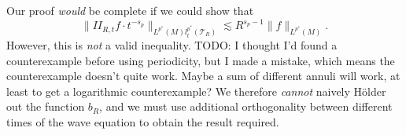 %
Our proof \emph{would} be complete if we could show that
%
\[ \| II_{R,t} f \cdot t^{-s_p} \|_{L^{p^*}(M) l^{p^*}_t(\mathcal{T}_R)} \lesssim R^{s_p - 1} \| f \|_{L^{p^*}(M)}. \]
%
However, this is \emph{not} a valid inequality. TODO: I thought I'd found a counterexample before using periodicity, but I made a mistake, which means the counterexample doesn't quite work. Maybe a sum of different annuli will work, at least to get a logarithmic counterexample? We therefore \emph{cannot} naively H\"{o}lder out the function $b_R$, and we must use additional orthogonality between different times of the wave equation to obtain the result required.

\begin{comment}

Using periodicity, if $R$ is divisible by $1/2$, then we can write
%
\begin{align*}
    &\int_{1/R \lesssim |t| \leq 1/2} \| e^{2 \pi i t P} f \|^{p^*}_{L^{p^*}(M)}\\
    &\quad \approx \frac{1}{2R} \int_{1/R \lesssim |t| \lesssim R} \| e^{2 \pi i t P} f \|_{L^{p^*}(M)}^{p^*}\; dt - (1 - 1/2R) \int_{|t| \lesssim 1/R} \| e^{2 \pi i t P} f \|_{L^{p^*}(M)}^{p^*}\; dt.
\end{align*}
%
The first term is just a rescaled local smoothing term. If $f$ is badly behaved, we can therefore expect to have
%
\begin{align*}
    \frac{1}{2R} \int_{1/R \lesssim |t| \lesssim R} \| e^{2 \pi i t P} f \|_{L^{p^*}(M)}^{p^*}\; dt &\approx R^{s_{p^*} p^*} \| f \|_{L^{p^*}(M)}^{p^*}\\
    &= R^{(d-1)(p^*/2 - 1) - 1} \| f \|_{L^{p^*}(M)}^{p^*}
\end{align*}
%
whereas we should also expect by pseudolocal finite speed of propogation and the intuitive local constancy of $f$ on scales $1/R$ that
%
\begin{align*}
    \int_{|t| \lesssim 1/R} |e^{2 \pi i t P} f|^{p^*}\; dt &\approx \| f \|_{L^{p^*}(M)}^{p^*}.
\end{align*}
%
Thus in the range of $p^*$ we are considering, the first term has much larger $L^p$ norm, and thus cannot be cancelled out by subtracting the second term. We thus conclude that in the worst case, we should expect
%
\[ \left( \int_{1/R \lesssim |t| \leq 1/2} \| e^{2 \pi i t P} f \|_{L^{p^*}(M)}^{p^*} \right)^{1/p^*} \gtrsim R^{(d-1)(1/2 - 1/p^*) - 1/p^*} \| f \|_{L^{p^*}(M)}. \]
%


\end{comment}

